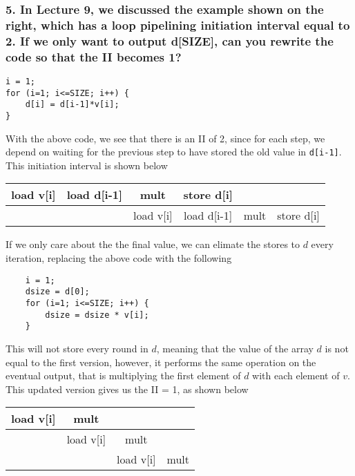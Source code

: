 \documentclass[titlepage]{article}
\def\code#1{\texttt{#1}}
\begin{document}
\subsubsection*{5. In Lecture 9, we discussed the example shown on the right,
which has a loop pipelining initiation interval equal to 2. If we only want to
output d[SIZE], can you rewrite the code so that the II becomes 1?}
\begin{verbatim}
i = 1;
for (i=1; i<=SIZE; i++) {
    d[i] = d[i-1]*v[i];
}
\end{verbatim}
With the above code, we see that there is an II of 2, since for each step, we
depend on waiting for the previous step to have stored the old value in 
\code{d[i-1]}. This initiation interval is shown below
\begin{center}
    \begin{tabular}{|c|c|c|c|c|c|}
        \hline
        load v[i] & load d[i-1] & mult & store d[i] & & \\
        \hline 
        & & load v[i] & load d[i-1] & mult & store d[i]\\
        \hline 
    \end{tabular}
\end{center}
If we only care about the the final value, we can elimate the stores to $d$
every iteration, replacing the above code with the following
\begin{verbatim}
    i = 1;
    dsize = d[0];
    for (i=1; i<=SIZE; i++) {
        dsize = dsize * v[i];
    }
\end{verbatim}
This will not store every round in $d$, meaning that the value of the array
$d$ is not equal to the first version, however, it performs the same operation
on the eventual output, that is multiplying the first element of $d$ with each
element of $v$. This updated version gives us the II = 1, as shown below
\begin{center}
    \begin{tabular}{|c|c|c|c|}
        \hline
        load v[i]  & mult & & \\
        \hline 
        & load v[i]  & mult & \\
        \hline 
        & & load v[i]  & mult \\
        \hline
    \end{tabular}
\end{center}
\end{document}
